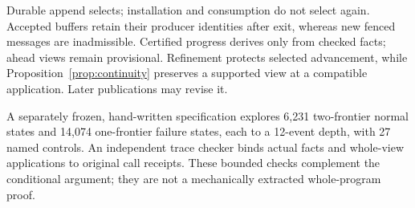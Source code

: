 Durable append selects; installation and consumption do not select again.
Accepted buffers retain their producer identities after exit, whereas new
fenced messages are inadmissible. Certified progress derives only from
checked facts; ahead views remain provisional. Refinement protects
selected advancement, while Proposition~\ref{prop:continuity} preserves a
supported view at a compatible application. Later publications may revise it.

A separately frozen, hand-written specification explores 6,231 two-frontier normal
states and 14,074 one-frontier failure states, each to a 12-event depth,
with 27 named controls. An independent trace checker binds actual facts
and whole-view applications to original call receipts. These bounded
checks complement the conditional argument; they are not a mechanically
extracted whole-program proof.

